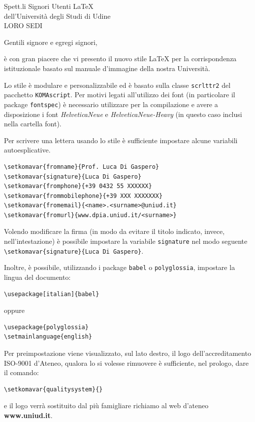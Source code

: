 \documentclass[dpia,subject=true]{scrlttr2}
\begin{document}
  \begin{letter}{Spett.li Signori Utenti \LaTeX \\
    dell'Università degli Studi di Udine \\
    \MakeUppercase{Loro Sedi}
    }
    \opening{Gentili signore e egregi signori,}

è con gran piacere che vi presento il nuovo stile \LaTeX{} per la corrispondenza istituzionale basato sul manuale d'immagine della nostra Università.

    Lo stile è modulare e personalizzabile ed è basato sulla classe \texttt{scrlttr2} del pacchetto \texttt{KOMAscript}. Per motivi legati all'utilizzo dei font (in particolare il package \texttt{fontspec}) è necessario utilizzare \XeLaTeX{} per la compilazione e avere a disposizione i font \emph{HelveticaNeue} e \emph{HelveticaNeue-Heavy} (in questo caso inclusi nella cartella font).
    
    Per scrivere una lettera usando lo stile è sufficiente impostare alcune variabili autoesplicative.
\begin{lstlisting}
\setkomavar{fromname}{Prof. Luca Di Gaspero}
\setkomavar{signature}{Luca Di Gaspero}
\setkomavar{fromphone}{+39 0432 55 XXXXXX}
\setkomavar{frommobilephone}{+39 XXX XXXXXXX}
\setkomavar{fromemail}{<name>.<surname>@uniud.it}
\setkomavar{fromurl}{www.dpia.uniud.it/<surname>}
\end{lstlisting}

    Volendo modificare la firma (in modo da evitare il titolo indicato, invece, nell'intestazione) è possibile impostare la variabile \texttt{signature} nel modo seguente \lstinline|\setkomavar{signature}{Luca Di Gaspero}|.

    Inoltre, è possibile, utilizzando i package \texttt{babel} o \texttt{polyglossia}, impostare la lingua del documento:
\begin{lstlisting}
\usepackage[italian]{babel}  
\end{lstlisting}
    oppure
\begin{lstlisting}
\usepackage{polyglossia}
\setmainlanguage{english}
\end{lstlisting}    

    Per preimpostazione viene visualizzato, sul lato destro, il logo dell'accreditamento ISO-9001 d'Ateneo, qualora lo si volesse rimuovere è sufficiente, nel prologo, dare il comando:
\begin{lstlisting}
\setkomavar{qualitysystem}{}
\end{lstlisting}
  e il logo verrà sostituito dal più famigliare richiamo al web d'ateneo \textbf{www.uniud.it}.


\end{letter}
\end{document}
